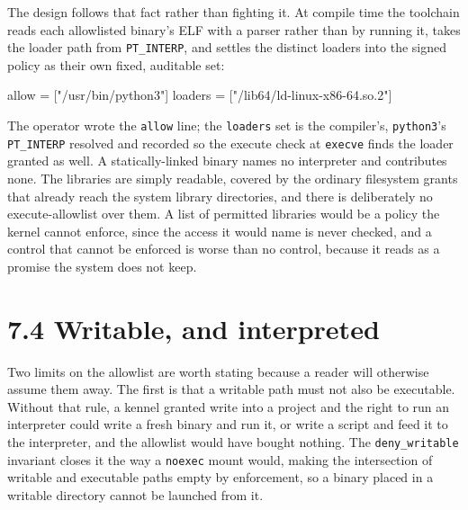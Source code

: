The design follows that fact rather than fighting it. At compile time
the toolchain reads each allowlisted binary's ELF with a parser rather
than by running it, takes the loader path from \texttt{PT\_INTERP}, and
settles the distinct loaders into the signed policy as their own fixed,
auditable set:

\begin{kennelcode}
[exec]
allow   = ["/usr/bin/python3"]
loaders = ["/lib64/ld-linux-x86-64.so.2"]
\end{kennelcode}

The operator wrote the \texttt{allow} line; the \texttt{loaders} set is
the compiler's, \texttt{python3}'s \texttt{PT\_INTERP} resolved and
recorded so the execute check at \texttt{execve} finds the loader
granted as well. A statically-linked binary names no interpreter and
contributes none. The libraries are simply readable, covered by the
ordinary filesystem grants that already reach the system library
directories, and there is deliberately no execute-allowlist over them. A
list of permitted libraries would be a policy the kernel cannot enforce,
since the access it would name is never checked, and a control that
cannot be enforced is worse than no control, because it reads as a
promise the system does not keep.

\hypertarget{writable-and-interpreted}{%
\section{7.4 Writable, and interpreted}\label{writable-and-interpreted}}

Two limits on the allowlist are worth stating because a reader will
otherwise assume them away. The first is that a writable path must not
also be executable. Without that rule, a kennel granted write into a
project and the right to run an interpreter could write a fresh binary
and run it, or write a script and feed it to the interpreter, and the
allowlist would have bought nothing. The \texttt{deny\_writable}
invariant closes it the way a \texttt{noexec} mount would, making the
intersection of writable and executable paths empty by enforcement, so a
binary placed in a writable directory cannot be launched from it.

